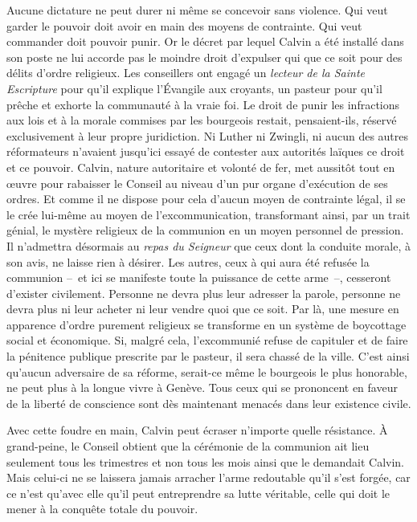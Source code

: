 \documentclass[french,twoside]{book} %
\begin{document}
\noindent Aucune dictature ne peut durer ni même se concevoir sans violence. Qui veut garder le pouvoir doit avoir en main des moyens de contrainte. Qui veut commander doit pouvoir punir. Or le décret par lequel Calvin a été installé dans son poste ne lui accorde pas le moindre droit d’expulser qui que ce soit pour des délits d’ordre religieux. Les conseillers ont engagé un \emph{lecteur de la Sainte Escripture} pour qu’il explique l’Évangile aux croyants, un pasteur pour qu’il prêche et exhorte la communauté à la vraie foi. Le droit de punir les infractions aux lois et à la morale commises par les bourgeois restait, pensaient-ils, réservé exclusivement à leur propre juridiction. Ni Luther ni Zwingli, ni aucun des autres réformateurs n’avaient jusqu’ici essayé de contester aux autorités laïques ce droit et ce pouvoir. Calvin, nature autoritaire et volonté de fer, met aussitôt tout en œuvre pour rabaisser le Conseil au niveau d’un pur organe d’exécution de ses ordres. Et comme il ne dispose pour cela d’aucun moyen de contrainte légal, il se le crée lui-même au moyen de l’excommunication, transformant ainsi, par un trait génial, le mystère religieux de la communion en un moyen personnel de pression. Il n’admettra désormais au \emph{repas du Seigneur} que ceux dont la conduite morale, à son avis, ne laisse rien à désirer. Les autres, ceux à qui aura été refusée la communion – et ici se manifeste toute la puissance de cette arme –, cesseront d’exister civilement. Personne ne devra plus leur adresser la parole, personne ne devra plus ni leur acheter ni leur vendre quoi que ce soit. Par là, une mesure en apparence d’ordre purement religieux se transforme en un système de boycottage social et économique. Si, malgré cela, l’excommunié refuse de capituler et de faire la pénitence publique prescrite par le pasteur, il sera chassé de la ville. C’est ainsi qu’aucun adversaire de sa réforme, serait-ce même le bourgeois le plus honorable, ne peut plus à la longue vivre à Genève. Tous ceux qui se prononcent en faveur de la liberté de conscience sont dès maintenant menacés dans leur existence civile.\par
Avec cette foudre en main, Calvin peut écraser n’importe quelle résistance. À grand-peine, le Conseil obtient que la cérémonie de la communion ait lieu seulement tous les trimestres et non tous les mois ainsi que le demandait Calvin. Mais celui-ci ne se laissera jamais arracher l’arme redoutable qu’il s’est forgée, car ce n’est qu’avec elle qu’il peut entreprendre sa lutte véritable, celle qui doit le mener à la conquête totale du pouvoir.\par
\end{document}
